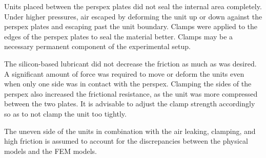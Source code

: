 Units placed between the perspex plates did not seal the internal area completely. Under higher pressures, air escaped by deforming the unit up or down against the perspex plates and escaping past the unit boundary. Clamps were applied to the edges of the perspex plates to seal the material better. Clamps may be a necessary permanent component of the experimental setup.

The silicon-based lubricant did not decrease the friction as much as was desired. A significant amount of force was required to move or deform the units even when only one side was in contact with the perspex. Clamping the sides of the perspex also increased the frictional resistance, as the unit was more compressed between the two plates. It is advisable to adjust the clamp strength accordingly so as to not clamp the unit too tightly.

The uneven side of the units in combination with the air leaking, clamping, and high friction is assumed to account for the discrepancies between the physical models and the FEM models.